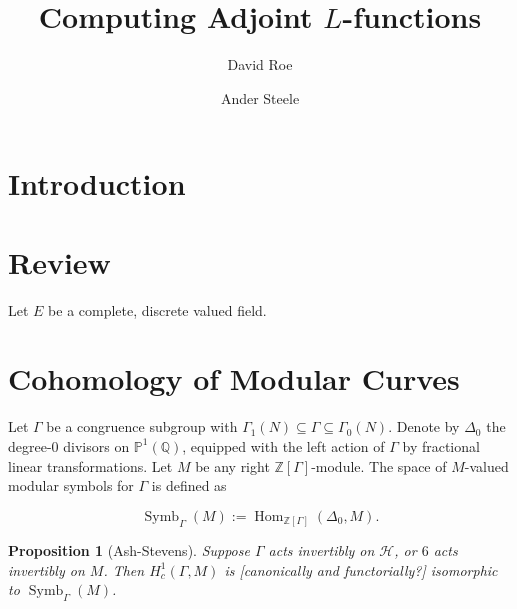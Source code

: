\documentclass[10pt]{amsart}
\title{Computing Adjoint $L$-functions}
\author{David Roe}
\author{Ander Steele}
\theoremstyle{plain}
\newtheorem{proposition}[theorem]{Proposition}
\theoremstyle{definition}
\newcommand{\ZZ}{{\mathbb{Z}}}
\newcommand{\QQ}{{\mathbb{Q}}}
\newcommand{\cH}{\mathcal{H}}
\DeclareMathOperator{\Hom}{Hom}
\DeclareMathOperator{\Symb}{Symb}
\DeclareMathOperator{\BSymb}{BSymb}
\begin{document}
\maketitle

\section{Introduction}

\section{Review}

Let $E$ be a complete, discrete valued field.  

\section{Cohomology of Modular Curves} \label{sec:mod_curve_cohom}

Let $\Gamma$ be a congruence subgroup with $\Gamma_1(N) \subseteq \Gamma \subseteq \Gamma_0(N)$. Denote by $\Delta_0$ the degree-$0$ divisors on $\mathbb{P}^1(\QQ)$, equipped with the left action of $\Gamma$ by fractional linear transformations. Let $M$ be any right $\ZZ[\Gamma]$-module. The space of $M$-valued modular symbols for $\Gamma$ is defined as

\begin{equation}
	\Symb_\Gamma(M) := \Hom_{\ZZ[\Gamma]}(\Delta_0, M).
\end{equation}

\begin{proposition}[Ash-Stevens]
Suppose $\Gamma$ acts invertibly on $\cH$, or $6$ acts invertibly on $M$. Then $H^1_c(\Gamma,M)$ is [canonically and functorially?] isomorphic to $\Symb_\Gamma(M)$.
\end{proposition}
\end{document}
